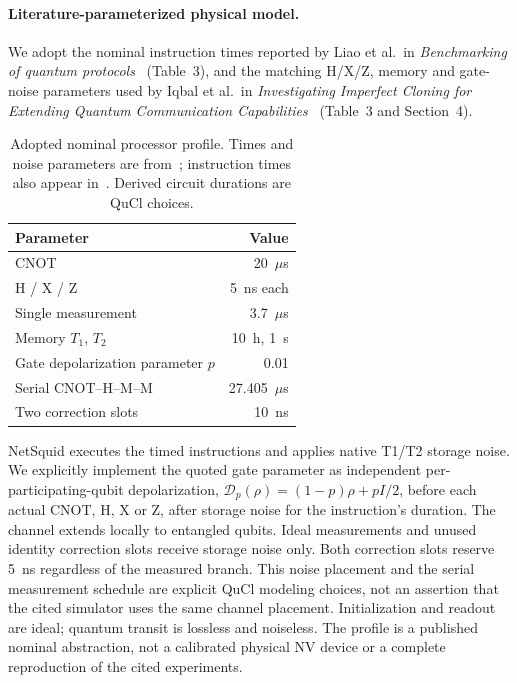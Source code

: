 \paragraph{Literature-parameterized physical model.}
We adopt the nominal instruction times reported by Liao et al.\ in
\emph{Benchmarking of quantum protocols}~\cite{liao2022benchmarking}
(Table~3), and the matching H/X/Z, memory and gate-noise parameters
used by Iqbal et al.\ in \emph{Investigating Imperfect Cloning for
Extending Quantum Communication Capabilities}~\cite{iqbal2023cloning}
(Table~3 and Section~4).
\begin{table}[t]
\centering
\caption{Adopted nominal processor profile. Times and noise parameters are
from~\cite{iqbal2023cloning}; instruction times also appear
in~\cite{liao2022benchmarking}. Derived circuit durations are QuCl choices.}
\label{tab:qucl-physical-profile}
\small
\begin{tabular}{@{}lr@{}}
\toprule
Parameter & Value \\
\midrule
CNOT & 20~$\mu$s \\
H / X / Z & 5~ns each \\
Single measurement & 3.7~$\mu$s \\
Memory $T_1$, $T_2$ & 10~h, 1~s \\
Gate depolarization parameter $p$ & 0.01 \\
\midrule
Serial CNOT--H--M--M & 27.405~$\mu$s \\
Two correction slots & 10~ns \\
\bottomrule
\end{tabular}
\end{table}

NetSquid executes the timed instructions and applies native T1/T2 storage
noise. We explicitly implement the quoted gate parameter as independent
per-participating-qubit depolarization,
$\mathcal{D}_p(\rho)=(1-p)\rho+pI/2$, before each actual CNOT, H, X or Z,
after storage noise for the instruction's duration. The channel extends
locally to entangled qubits. Ideal measurements and unused identity
correction slots receive storage noise only. Both correction slots
reserve 5~ns regardless of the measured branch.
This noise placement and the serial measurement schedule are explicit
QuCl modeling choices, not an assertion that the cited simulator uses
the same channel placement. Initialization and readout are ideal;
quantum transit is lossless and noiseless. The profile is a published
nominal abstraction, not a calibrated physical NV device or a complete
reproduction of the cited experiments.
